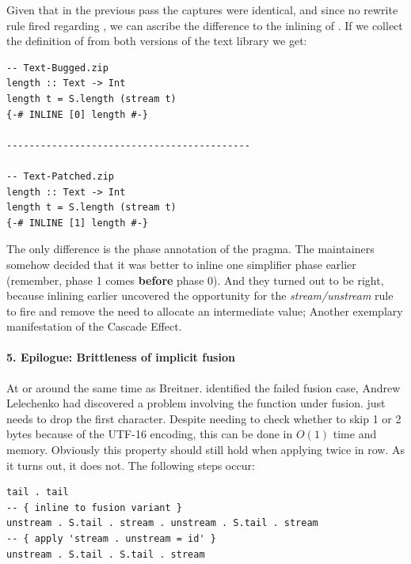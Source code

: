 Given that in the previous pass the captures were identical, and since no rewrite rule fired regarding ,
we can ascribe the difference to the inlining of . If we collect the definition of  from both versions
of the text library we get:

\begin{listing}[H]
\begin{verbatim}
-- Text-Bugged.zip
length :: Text -> Int
length t = S.length (stream t)
{-# INLINE [0] length #-}

-------------------------------------------

-- Text-Patched.zip
length :: Text -> Int
length t = S.length (stream t)
{-# INLINE [1] length #-}
\end{verbatim}
\end{listing}

The only difference is the phase annotation of the  pragma. The maintainers somehow decided that it was better
to inline  one simplifier phase earlier (remember, phase 1 comes \textbf{before} phase 0). And they turned out to be right,
because inlining earlier uncovered the opportunity for the \textit{stream/unstream} rule to fire and remove 
the need to allocate an intermediate  value; Another exemplary manifestation of the Cascade Effect.

\paragraph{5. Epilogue: Brittleness of implicit fusion}
At or around the same time as Breitner. \cite{inspection_testing} identified the failed fusion case, Andrew Lelechenko had discovered
a problem involving the  function \cite{two_tails} under fusion.  just needs to drop the first character.
Despite needing to check whether to skip 1 or 2 bytes because of the UTF-16 encoding, this can be done in $O(1)$ time and memory.
Obviously this property should still hold when applying  twice in row. As it turns out, it does not. The following steps occur:

\begin{listing}[H]
\begin{verbatim}
tail . tail
-- { inline to fusion variant }
unstream . S.tail . stream . unstream . S.tail . stream
-- { apply 'stream . unstream = id' }
unstream . S.tail . S.tail . stream
\end{verbatim}
\end{listing}

